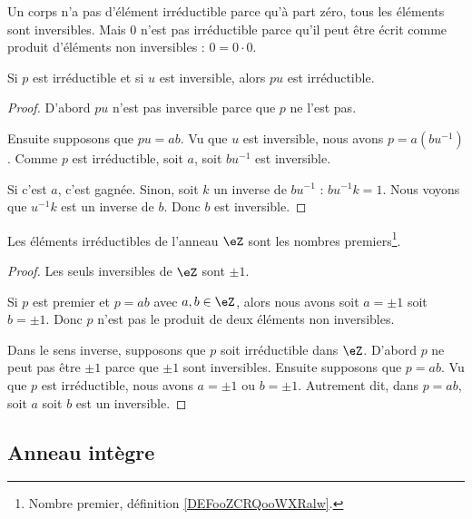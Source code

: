\begin{example}
	Un corps n'a pas d'élément irréductible parce qu'à part zéro, tous les éléments sont inversibles. Mais \( 0\) n'est pas irréductible parce qu'il peut être écrit comme produit d'éléments non inversibles : \( 0=0\cdot 0\).
\end{example}

\begin{lemma}		\label{LEMooJBUJooScsiGc}
	Si \( p\) est irréductible et si \( u\) est inversible, alors \( pu\) est irréductible.
\end{lemma}

\begin{proof}
	D'abord \( pu\) n'est pas inversible parce que \( p\) ne l'est pas.

	Ensuite supposons que \( pu=ab\). Vu que \( u\) est inversible, nous avons \( p=a(bu^{-1})\). Comme \( p\) est irréductible, soit \( a\), soit \( bu^{-1}\) est inversible.

	Si c'est \( a\), c'est gagnée. Sinon, soit \( k\) un inverse de \( bu^{-1}\) : \( bu^{-1}k=1\). Nous voyons que \( u^{-1}k\) est un inverse de \( b\). Donc \( b\) est inversible.
\end{proof}

\begin{proposition}     \label{PROPooKDWQooTtScrN}
	Les éléments irréductibles de l'anneau \( \eZ\) sont les nombres premiers\footnote{Nombre premier, définition \ref{DEFooZCRQooWXRalw}.}.
\end{proposition}

\begin{proof}
	Les seuls inversibles de \( \eZ\) sont \( \pm 1\).

	Si \( p\) est premier et \( p=ab\) avec \( a,b\in \eZ\), alors nous avons soit \( a=\pm 1\) soit \( b=\pm 1\). Donc \( p\) n'est pas le produit de deux éléments non inversibles.

	Dans le sens inverse, supposons que \( p\) soit irréductible dans \( \eZ\). D'abord \( p\) ne peut pas être \( \pm 1\) parce que \( \pm 1\) sont inversibles. Ensuite supposons que \( p=ab\). Vu que \( p\) est irréductible, nous avons \( a=\pm1\) ou \( b=\pm1\). Autrement dit, dans \( p=ab\), soit \( a\) soit \( b\) est un inversible.
\end{proof}

\subsection{Anneau intègre}

